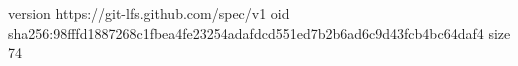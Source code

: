 version https://git-lfs.github.com/spec/v1
oid sha256:98fffd1887268c1fbea4fe23254adafdcd551ed7b2b6ad6c9d43fcb4bc64daf4
size 74
